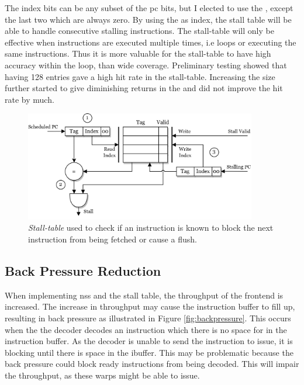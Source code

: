 The index bits can be any subset of the \acrshort{pc} bits, but I elected to use the , except the last two which are always zero. By using the  as index, the stall table will be able to handle consecutive stalling instructions. The stall-table will only be effective when instructions are executed multiple times, i.e loops or  executing the same instructions. Thus it is more valuable for the stall-table to have high accuracy within the loop, than wide coverage. Preliminary testing showed that having 128 entries gave a high hit rate in the stall-table. Increasing the size further started to give diminishing returns in the and did not improve the hit rate by much. 

\begin{figure}
    \centering
    \includegraphics[width=0.9\textwidth]{figures/stall_table.png}
    \caption[Illustration of the stall table.]{\textit{Stall-table} used to check if an instruction is known to block the next instruction from being fetched or cause a flush.}
    \label{fig:stall_table}
\end{figure}



\subsection{Back Pressure Reduction}

When implementing \acrshort{nss} and the stall table, the throughput of the frontend is increased. The increase in throughput may cause the instruction buffer to fill up, resulting in back pressure as illustrated in Figure \ref{fig:backpressure}. This occurs when the the decoder decodes an instruction which there is no space for in the instruction buffer. As the decoder is unable to send the instruction to issue, it is blocking until there is space in the ibuffer. This may be problematic because the back pressure could block ready instructions from being decoded. This will impair the throughput, as these warps might be able to issue.

